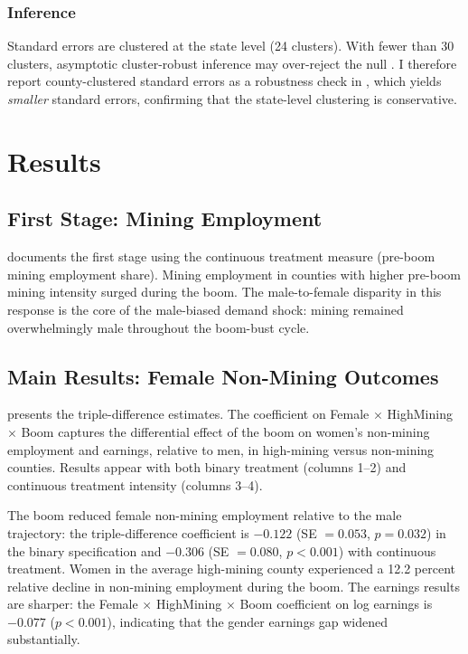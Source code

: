\documentclass[12pt]{article}
\begin{document}
\subsubsection*{Inference} Standard errors are clustered at the state level (24 clusters). With fewer than 30 clusters, asymptotic cluster-robust inference may over-reject the null \citep{Cameron2008}. I therefore report county-clustered standard errors as a robustness check in , which yields \textit{smaller} standard errors, confirming that the state-level clustering is conservative.

\section{Results}

\subsection{First Stage: Mining Employment}

 documents the first stage using the continuous treatment measure (pre-boom mining employment share). Mining employment in counties with higher pre-boom mining intensity surged during the boom. The male-to-female disparity in this response is the core of the male-biased demand shock: mining remained overwhelmingly male throughout the boom-bust cycle.

\subsection{Main Results: Female Non-Mining Outcomes}

 presents the triple-difference estimates. The coefficient on Female $\times$ HighMining $\times$ Boom captures the differential effect of the boom on women's non-mining employment and earnings, relative to men, in high-mining versus non-mining counties. Results appear with both binary treatment (columns 1--2) and continuous treatment intensity (columns 3--4).

The boom reduced female non-mining employment relative to the male trajectory: the triple-difference coefficient is $-0.122$ (SE $= 0.053$, $p = 0.032$) in the binary specification and $-0.306$ (SE $= 0.080$, $p < 0.001$) with continuous treatment. Women in the average high-mining county experienced a 12.2 percent relative decline in non-mining employment during the boom. The earnings results are sharper: the Female $\times$ HighMining $\times$ Boom coefficient on log earnings is $-0.077$ ($p < 0.001$), indicating that the gender earnings gap widened substantially.
\end{document}
